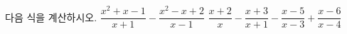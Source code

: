 다음 식을 계산하시오.
 $\dfrac{x^2+x-1}{x+1}-\dfrac{x^2-x+2}{x-1}$
 $\dfrac{x+2}{x}-\dfrac{x+3}{x+1}-\dfrac{x-5}{x-3}+\dfrac{x-6}{x-4}$
